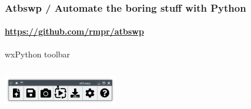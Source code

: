 \documentclass{beamer}
\begin{document}
    \begin{frame}
        \frametitle{Atbswp / Automate the boring stuff with Python}
        \framesubtitle{\url{https://github.com/rmpr/atbswp}}

        wxPython toolbar

        \begin{columns}

            \begin{column}{5cm}
                \includegraphics[width=5cm]{Images/atbswp_screenshot.png}
            \end{column}
        \end{columns}
    \end{frame}
\end{document}
